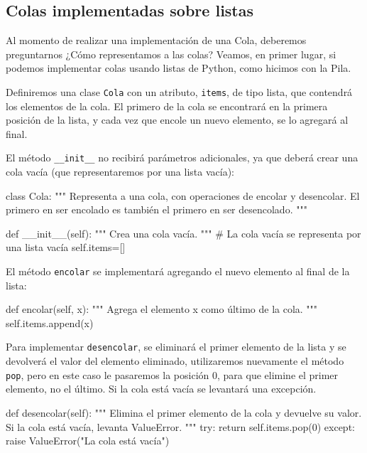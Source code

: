 \subsection{Colas implementadas sobre listas}

Al momento de realizar una implementación de una Cola, deberemos
preguntarnos ¿Cómo representamos a las colas? Veamos, en primer lugar, si
podemos implementar colas usando listas de Python, como hicimos con la Pila.

Definiremos una clase {\tt Cola} con un atributo, {\tt items}, de tipo
lista, que contendrá los elementos de la cola. El primero de la cola se
encontrará en la primera posición de la lista, y cada vez que encole un
nuevo elemento, se lo agregará al final.

El método \lstinline+__init__+ no recibirá parámetros adicionales, ya que
deberá crear una cola vacía (que representaremos por una lista vacía):

\begin{codigo-python-sn}
class Cola:
    """ Representa a una cola, con operaciones de encolar y
        desencolar.  El primero en ser encolado es también el primero
        en ser desencolado. """

    def __init__(self):
        """ Crea una cola vacía. """
        # La cola vacía se representa por una lista vacía
        self.items=[]
\end{codigo-python-sn}

El método \lstinline!encolar! se implementará agregando el nuevo elemento
al final de la lista:

\begin{codigo-python-sn}
    def encolar(self, x):
        """ Agrega el elemento x como último de la cola. """
        self.items.append(x)
\end{codigo-python-sn}

Para implementar \lstinline!desencolar!, se eliminará el primer elemento de
la lista y se devolverá el valor del elemento eliminado, utilizaremos
nuevamente el método \lstinline!pop!, pero en este caso le pasaremos la
posición $0$, para que elimine el primer elemento, no el último. Si la cola
está vacía se levantará una excepción.

\begin{codigo-python-sn}
    def desencolar(self):
        """ Elimina el primer elemento de la cola y devuelve su
            valor. Si la cola está vacía, levanta ValueError. """
        try:
          return self.items.pop(0)
        except:
          raise ValueError("La cola está vacía")
\end{codigo-python-sn}

